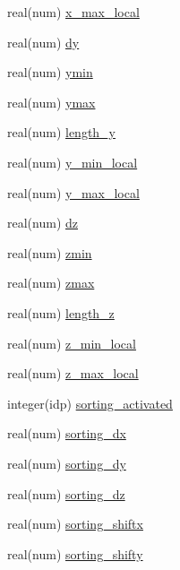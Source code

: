 \begin{DoxyCompactItemize}
real(num) \hyperlink{namespaceshared__data_ab8f75a4e4e6aa88619c4f1cfde4dae1c}{x\+\_\+max\+\_\+local}
\item 
real(num) \hyperlink{namespaceshared__data_a6531be1297bb2ed26fdf8e7336d85e38}{dy}
\item 
real(num) \hyperlink{namespaceshared__data_a1a0991602b1e5feb2d937663c8e31927}{ymin}
\item 
real(num) \hyperlink{namespaceshared__data_abe75e74d4222157dbf64bb183266cd5d}{ymax}
\item 
real(num) \hyperlink{namespaceshared__data_a02349b6fb6d5942cb9aef10c149ff10f}{length\+\_\+y}
\item 
real(num) \hyperlink{namespaceshared__data_a3e7f4b2ead34c7eb9885b4b896127441}{y\+\_\+min\+\_\+local}
\item 
real(num) \hyperlink{namespaceshared__data_a0fb4b2d73929a142db79b38b0fdf8545}{y\+\_\+max\+\_\+local}
\item 
real(num) \hyperlink{namespaceshared__data_a2fb63621d7a6ce9df1700fe5cca75d01}{dz}
\item 
real(num) \hyperlink{namespaceshared__data_aa449f330a5cea14b12af9b1a68766626}{zmin}
\item 
real(num) \hyperlink{namespaceshared__data_aff54734070a6327d11c386fed6a31878}{zmax}
\item 
real(num) \hyperlink{namespaceshared__data_af762174f9cfb2c99e68a8eb993d220a0}{length\+\_\+z}
\item 
real(num) \hyperlink{namespaceshared__data_a1fb130b65ef2a707c1a79f91089e7dc0}{z\+\_\+min\+\_\+local}
\item 
real(num) \hyperlink{namespaceshared__data_a7931e0059b790ccef3cc00c59d806c7c}{z\+\_\+max\+\_\+local}
\item 
integer(idp) \hyperlink{namespaceshared__data_aa7be2be1e809cb95538e562e604c4f1e}{sorting\+\_\+activated}
\item 
real(num) \hyperlink{namespaceshared__data_a3f406bc80cf450b11767a651d0ea651c}{sorting\+\_\+dx}
\item 
real(num) \hyperlink{namespaceshared__data_a4fd74c6832df0957cd1b786cf2cc6810}{sorting\+\_\+dy}
\item 
real(num) \hyperlink{namespaceshared__data_aa30e6dbb24284ab1c4dae4ba5e219eb4}{sorting\+\_\+dz}
\item 
real(num) \hyperlink{namespaceshared__data_a7809127b7e85af886b2fd72b3bbdd065}{sorting\+\_\+shiftx}
\item 
real(num) \hyperlink{namespaceshared__data_a0f7304391a34d6a0216cab82d97ee037}{sorting\+\_\+shifty}

\end{DoxyCompactItemize}
